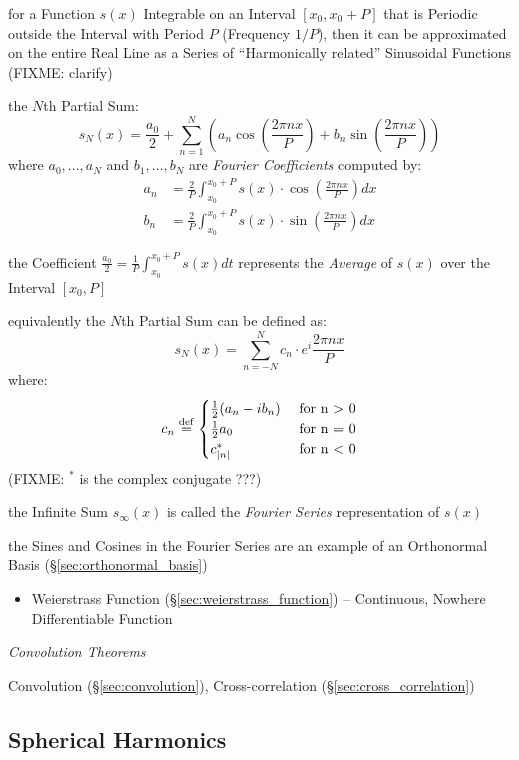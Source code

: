 for a Function $s(x)$ Integrable on an Interval $[x_0,x_0 + P]$ that is
Periodic outside the Interval with Period $P$ (Frequency $1/P$), then it can be
approximated on the entire Real Line as a Series of ``Harmonically related''
Sinusoidal Functions (FIXME: clarify)

the $N$th Partial Sum:
\[
  s_N(x) = \frac{a_0}{2} + \sum_{n=1}^N \left(
    a_n\cos(\frac{2\pi{nx}}{P}) + b_n\sin(\frac{2\pi{nx}}{P})
  \right)
\]
where $a_0,\ldots,a_N$ and $b_1,\ldots,b_N$ are \emph{Fourier Coefficients}
computed by:
\begin{align*}
  a_n & = \frac{2}{P}\int_{x_0}^{x_0+P}s(x) \cdot \cos(\frac{2\pi{nx}}{P}) dx \\
  b_n & = \frac{2}{P}\int_{x_0}^{x_0+P}s(x) \cdot \sin(\frac{2\pi{nx}}{P}) dx
\end{align*}

the Coefficient $\frac{a_0}{2} = \frac{1}{P}\int_{x_0}^{x_0+P}s(x)dt$
represents the \emph{Average} of $s(x)$ over the Interval $[x_0,P]$

equivalently the $N$th Partial Sum can be defined as:
\[
  s_N(x) = \sum_{n=-N}^N c_n \cdot e^i\frac{2\pi{nx}}{P}
\]
where:
\[
  c_n \stackrel{\mathrm{def}}= \begin{cases}
    \frac{1}{2}(a_n - ib_n) &\ \text{for n > 0} \\
    \frac{1}{2}a_0          &\ \text{for n = 0} \\
    c_{|n|}^*               &\ \text{for n < 0}
  \end{cases}
\]
(FIXME: $^*$ is the complex conjugate ???)

the Infinite Sum $s_\infty(x)$ is called the \emph{Fourier Series}
representation of $s(x)$

the Sines and Cosines in the Fourier Series are an example of an Orthonormal
Basis (\S\ref{sec:orthonormal_basis})

\begin{itemize}
  \item Weierstrass Function (\S\ref{sec:weierstrass_function}) -- Continuous,
    Nowhere Differentiable Function
\end{itemize}


\emph{Convolution Theorems}

Convolution (\S\ref{sec:convolution}), Cross-correlation
(\S\ref{sec:cross_correlation})



\subsection{Spherical Harmonics}\label{sec:spherical_harmonics}



